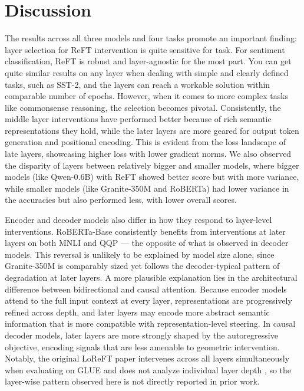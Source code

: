\documentclass[conference]{IEEEtran}
\begin{document}
	\section{Discussion}
	
	The results across all three models and four tasks promote an important finding: layer selection for ReFT intervention is quite sensitive for task. For sentiment classification, ReFT is robust and layer-agnostic for the most part. You can get quite similar results on any layer when dealing with simple and clearly defined tasks, such as SST-2, and the layers can reach a workable solution within comparable number of epochs. However, when it comes to more complex tasks like commonsense reasoning, the selection becomes pivotal. Consistently, the middle layer interventions have performed better because of rich semantic representations they hold, while the later layers are more geared for output token generation and positional encoding. This is evident from the loss landscape of late layers, showcasing higher loss with lower gradient norms. We also observed the disparity of layers between relatively bigger and smaller models, where bigger models (like Qwen-0.6B) with ReFT showed better score but with more variance, while smaller models (like Granite-350M and RoBERTa) had lower variance in the accuracies but also performed less, with lower overall scores.

	Encoder and decoder models also differ in how they respond to layer-level interventions. RoBERTa-Base consistently benefits from interventions at later layers on both MNLI and QQP — the opposite of what is observed in decoder models. This reversal is unlikely to be explained by model size alone, since Granite-350M is comparably sized yet follows the decoder-typical pattern of degradation at later layers. A more plausible explanation lies in the architectural difference between bidirectional and causal attention. Because encoder models attend to the full input context at every layer, representations are progressively refined across depth, and later layers may encode more abstract semantic information that is more compatible with representation-level steering. In causal decoder models, later layers are more strongly shaped by the autoregressive objective, encoding signals that are less amenable to geometric intervention. Notably, the original LoReFT paper intervenes across all layers simultaneously when evaluating on GLUE and does not analyze individual layer depth \cite{wu2024reft}, so the layer-wise pattern observed here is not directly reported in prior work.
\end{document}
